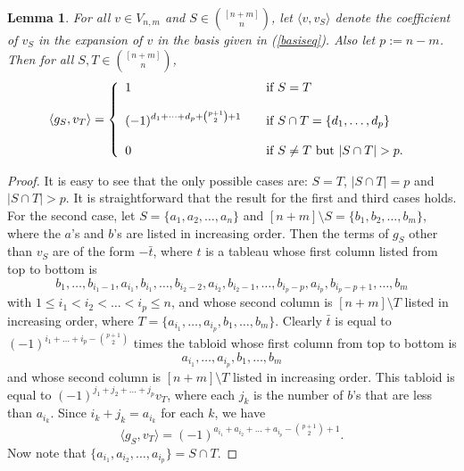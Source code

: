 \documentclass[12pt]{amsart}
\numberwithin{equation}{section}
\newtheorem{lemma}[theorem]{Lemma}
\begin{document}
\begin{lemma} \label{coefth} For all $v \in V_{n,m}$ and $S \in \binom{[n+m]}n$, let $\langle v,v_S \rangle$ denote the coefficient of $v_S$ in the expansion of $v$ in the basis given in (\ref{basiseq}).  Also let $p:= n-m$. Then for all $S,T \in \binom{[n+m]}{n}$,
$$\langle g_S,v_T \rangle = \left\{
  \begin{array}{l l}

1& \quad  \text{if } S=T  \\
\\

    (-1)^{d_1+ \dots + d_{p} +\binom{p +1}2+1}&  \quad  \text{if } S\cap T = \{d_1,\dots, d_{p}\}\\
\\ 
    0 & \quad \text{if } S\neq T \text{ but } |S\cap T| >p . \
  \end{array} \right.$$
\end{lemma}
\begin{proof} It is easy to see that  the only possible cases are: $S=T$, $|S\cap T| = p$  and $|S\cap T|  > p$. 
 It is straightforward that the  result for the first and third cases holds.  For the second case, let $S = \{a_1,a_2,\dots,a_n \}$ 
 and $[n+m] \setminus S = \{b_1,b_2,\dots,b_m \}$, where the $a$'s and $b$'s are listed in increasing order. 
 Then the terms of $g_S$  other than $v_S$ are of the form $-\bar t$, where $t$ is a tableau whose   first column listed from top 
 to bottom is  $$b_1, \dots, b_{i_1-1}, a_{i_1}, b_{i_1}, \dots, b_{i_2-2}, a_{i_2}, b_{i_2-1},\dots,
 b_{i_p-p}, a_{i_p}, b_{i_p-p+1}, \dots ,b_m $$ with  $1\le i_1<i_2<\dots<i_p\le n$, and whose second column is $[n+m] \setminus T$ listed in increasing order,
  where $T=\{  a_{i_1}, \dots, a_{i_p}, b_1, \dots, b_m\}$. 
 Clearly $\bar t$ is equal to $(-1)^{i_1+\dots+i_p-\binom {p+1}2}$ times the tabloid   whose first column from top to bottom is 
 $$ a_{i_1}, \dots, a_{i_p}, b_1, \dots, b_m$$ and whose second column is $[n+m] \setminus T$ listed in increasing order.  This tabloid is equal to 
 $(-1)^{j_1+j_2+\dots+j_p} v_T$, where  each  $j_k$ is the number of $b$'s  that 
 are less than $a_{i_k}$.   Since 
 $i_k + j_k= a_{i_k}$ for each $k$,  we have
 $$\langle g_S, v_T\rangle = (-1)^{a_{i_1} + a_{i_2} + \dots +a_{i_p}-\binom{p+1}2 +1}.$$ Now note that  $\{a_{i_1}, a_{i_2}, \dots, a_{i_p}\} = S \cap T$.
\end{proof}
\end{document}
